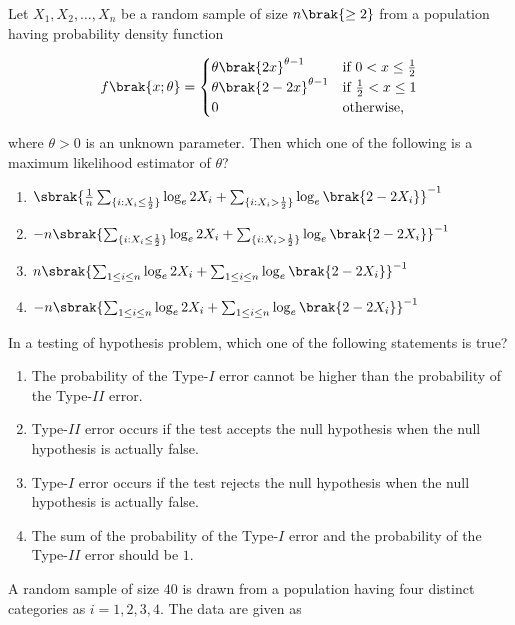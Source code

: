 \item Let $X_1, X_2, \dots, X_n$ be a random sample of size $n \brak{\geq 2}$ from a population having probability density function

\[
f\brak{x; \theta} = \begin{cases}
\theta\brak{2x}^{\theta-1} & \text{if } 0 < x \leq \frac{1}{2} \\
\theta\brak{2-2x}^{\theta-1} & \text{if } \frac{1}{2} < x \leq 1 \\
0 & \text{otherwise,}
\end{cases}
\]

where $\theta > 0$ is an unknown parameter. Then which one of the following is a maximum likelihood estimator of $\theta$?

\begin{enumerate}
    \item $\sbrak{\frac{1}{n} \sum_{\{i: X_i \leq \frac{1}{2}\}} \log_e 2X_i + \sum_{\{i: X_i > \frac{1}{2}\}} \log_e \brak{2-2X_i}}^{-1}$
    \item $-n \sbrak{\sum_{\{i: X_i \leq \frac{1}{2}\}} \log_e 2X_i + \sum_{\{i: X_i > \frac{1}{2}\}} \log_e \brak{2-2X_i}}^{-1}$
    \item $n \sbrak{\sum_{1 \leq i \leq n} \log_e 2X_i + \sum_{1 \leq i \leq n} \log_e \brak{2-2X_i}}^{-1}$
    \item $-n \sbrak{\sum_{1 \leq i \leq n} \log_e 2X_i + \sum_{1 \leq i \leq n} \log_e \brak{2-2X_i}}^{-1}$
\end{enumerate}

\item In a testing of hypothesis problem, which one of the following statements is true?

\begin{enumerate}
    \item The probability of the Type-$I$ error cannot be higher than the probability of the Type-$II$ error.
    \item Type-$II$ error occurs if the test accepts the null hypothesis when the null hypothesis is actually false.
    \item Type-$I$ error occurs if the test rejects the null hypothesis when the null hypothesis is actually false.
    \item The sum of the probability of the Type-$I$ error and the probability of the Type-$II$ error should be $1$.
\end{enumerate}

\item A random sample of size $40$ is drawn from a population having four distinct categories as $i = 1, 2, 3, 4$. The data are given as


